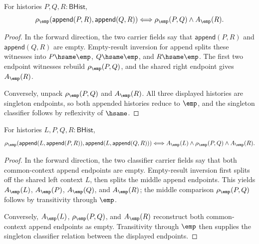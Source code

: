 \begin{theorem}
\label{thm:matrix-singleton-classifier-append-right-cancellation}
For histories $P,Q,R:\mathsf{BHist}$,
$$
\rho_{\emp}(\mathsf{append}(P,R),\mathsf{append}(Q,R))
\Longleftrightarrow
\rho_{\emp}(P,Q)\land A_{\emp}(R).
$$
\end{theorem}
\begin{proof}
In the forward direction, the two carrier fields say that
$\mathsf{append}(P,R)$ and $\mathsf{append}(Q,R)$ are empty. Empty-result
inversion for append splits these witnesses into $P\hsame\emp$,
$Q\hsame\emp$, and $R\hsame\emp$. The first two endpoint witnesses rebuild
$\rho_{\emp}(P,Q)$, and the shared right endpoint gives $A_{\emp}(R)$.

Conversely, unpack $\rho_{\emp}(P,Q)$ and $A_{\emp}(R)$. All three displayed
histories are singleton endpoints, so both appended histories reduce to
$\emp$, and the singleton classifier follows by reflexivity of $\hsame$.
\end{proof}

\begin{theorem}
\label{thm:matrix-singleton-classifier-append-common-context}
For histories $L,P,Q,R:\mathsf{BHist}$,
$$
\rho_{\emp}(\mathsf{append}(L,\mathsf{append}(P,R)),
  \mathsf{append}(L,\mathsf{append}(Q,R)))
\Longleftrightarrow
A_{\emp}(L)\land \rho_{\emp}(P,Q)\land A_{\emp}(R).
$$
\end{theorem}
\begin{proof}
In the forward direction, the two classifier carrier fields say that both
common-context append endpoints are empty. Empty-result inversion first splits
off the shared left context $L$, then splits the middle append endpoints. This
yields $A_{\emp}(L)$, $A_{\emp}(P)$, $A_{\emp}(Q)$, and $A_{\emp}(R)$; the
middle comparison $\rho_{\emp}(P,Q)$ follows by transitivity through $\emp$.

Conversely, $A_{\emp}(L)$, $\rho_{\emp}(P,Q)$, and $A_{\emp}(R)$ reconstruct
both common-context append endpoints as empty. Transitivity through $\emp$
then supplies the singleton classifier relation between the displayed
endpoints.
\end{proof}


